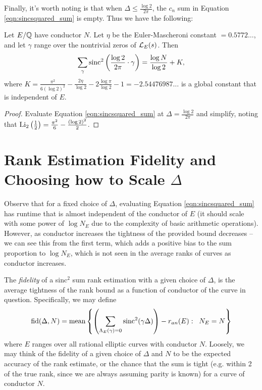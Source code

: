 Finally, it's worth noting is that when $\Delta \le \frac{\log 2}{2\pi}$, the $c_n$ sum in Equation \ref{eqn:sincsquared_sum} is empty. Thus we have the following:
\begin{corollary}
Let $E/\mathbb{Q}$ have conductor $N$. Let $\eta$ be the Euler-Mascheroni constant $=0.5772\ldots$, and let $\gamma$ range over the nontrivial zeros of $\mathcal{L}_E(s)$. Then
\begin{equation}
\sum_{\gamma} \text{sinc}^2\left(\frac{\log 2}{2\pi} \cdot \gamma \right) = \frac{\log N}{\log 2} + K,
\end{equation}
where $K = \frac{\pi^2}{6(\log 2)^2} - \frac{2\eta}{\log 2} - 2\frac{\log \pi}{\log 2} - 1 = -2.54476987\ldots$ is a global constant that is independent of $E$.
\end{corollary}
\begin{proof}
Evaluate Equation \ref{eqn:sincsquared_sum} at $\Delta = \frac{\log 2}{2\pi}$ and simplify, noting that $\text{Li}_2\left(\frac{1}{2}\right) = \frac{\pi^2}{6} - \frac{(\log 2)^2}{2}$.
\end{proof}

\newpage
\section{Rank Estimation Fidelity and Choosing how to Scale $\Delta$}

Observe that for a fixed choice of $\Delta$, evaluating Equation \ref{eqn:sincsquared_sum} has runtime that is almost independent of the conductor of $E$ (it should scale with some power of $\log N_E$ due to the complexity of basic arithmetic operations). However, as conductor increases the tightness of the provided bound decreases -- we can see this from the first term, which adds a positive bias to the sum proportion to $\log N_E$, which is not seen in the average ranks of curves as conductor increases. \\

\begin{definition}
The {\it fidelity} of a sinc$^2$ sum rank estimation with a given choice of $\Delta$, is the average tightness of the rank bound as a function of conductor of the curve in question. Specifically, we may define
\begin{equation}
\mbox{fid}(\Delta,N) = \mbox{mean}\left\{\left(\sum_{\Lambda_E(\gamma)=0}\text{sinc}^2(\gamma \Delta)\right) - r_{an}(E):\;\; N_E = N\right\}
\end{equation}
where $E$ ranges over all rational elliptic curves with conductor $N$. Loosely, we may think of the fidelity of a given choice of $\Delta$ and $N$ to be the expected accuracy of the rank estimate, or the chance that the sum is tight (e.g. within 2 of the true rank, since we are always assuming parity is known) for a curve of conductor $N$. 
\end{definition}

